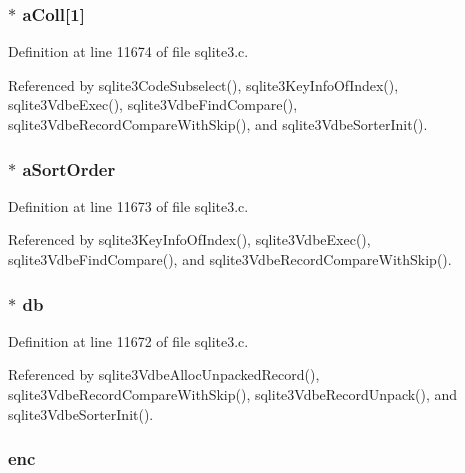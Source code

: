 \subsubsection[{a\+Coll}]{$\ast$ a\+Coll\mbox{[}1\mbox{]}}\label{struct_key_info_affa63783cac77f4126820ca112c63c2f}


Definition at line 11674 of file sqlite3.\+c.



Referenced by sqlite3\+Code\+Subselect(), sqlite3\+Key\+Info\+Of\+Index(), sqlite3\+Vdbe\+Exec(), sqlite3\+Vdbe\+Find\+Compare(), sqlite3\+Vdbe\+Record\+Compare\+With\+Skip(), and sqlite3\+Vdbe\+Sorter\+Init().

\hypertarget{struct_key_info_ace4725075c963b97eb9a9a0db1be905b}{}
\subsubsection[{a\+Sort\+Order}]{$\ast$ a\+Sort\+Order}\label{struct_key_info_ace4725075c963b97eb9a9a0db1be905b}


Definition at line 11673 of file sqlite3.\+c.



Referenced by sqlite3\+Key\+Info\+Of\+Index(), sqlite3\+Vdbe\+Exec(), sqlite3\+Vdbe\+Find\+Compare(), and sqlite3\+Vdbe\+Record\+Compare\+With\+Skip().

\hypertarget{struct_key_info_ad6e663497d2c934364b3bcf07496b30b}{}
\subsubsection[{db}]{$\ast$ db}\label{struct_key_info_ad6e663497d2c934364b3bcf07496b30b}


Definition at line 11672 of file sqlite3.\+c.



Referenced by sqlite3\+Vdbe\+Alloc\+Unpacked\+Record(), sqlite3\+Vdbe\+Record\+Compare\+With\+Skip(), sqlite3\+Vdbe\+Record\+Unpack(), and sqlite3\+Vdbe\+Sorter\+Init().

\hypertarget{struct_key_info_a9c71ab1f0d39a2b088a6d8a1093159c0}{}
\subsubsection[{enc}]{ enc}\label{struct_key_info_a9c71ab1f0d39a2b088a6d8a1093159c0}


